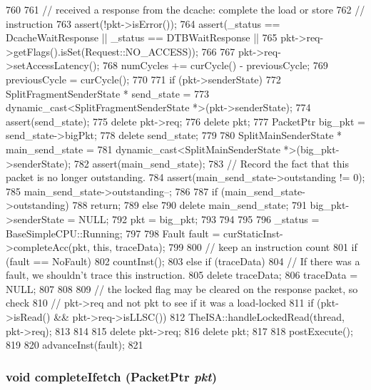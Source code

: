 \begin{DoxyCode}
760 {
761     // received a response from the dcache: complete the load or store
762     // instruction
763     assert(!pkt->isError());
764     assert(_status == DcacheWaitResponse || _status == DTBWaitResponse ||
765            pkt->req->getFlags().isSet(Request::NO_ACCESS));
766 
767     pkt->req->setAccessLatency();
768     numCycles += curCycle() - previousCycle;
769     previousCycle = curCycle();
770 
771     if (pkt->senderState) {
772         SplitFragmentSenderState * send_state =
773             dynamic_cast<SplitFragmentSenderState *>(pkt->senderState);
774         assert(send_state);
775         delete pkt->req;
776         delete pkt;
777         PacketPtr big_pkt = send_state->bigPkt;
778         delete send_state;
779         
780         SplitMainSenderState * main_send_state =
781             dynamic_cast<SplitMainSenderState *>(big_pkt->senderState);
782         assert(main_send_state);
783         // Record the fact that this packet is no longer outstanding.
784         assert(main_send_state->outstanding != 0);
785         main_send_state->outstanding--;
786 
787         if (main_send_state->outstanding) {
788             return;
789         } else {
790             delete main_send_state;
791             big_pkt->senderState = NULL;
792             pkt = big_pkt;
793         }
794     }
795 
796     _status = BaseSimpleCPU::Running;
797 
798     Fault fault = curStaticInst->completeAcc(pkt, this, traceData);
799 
800     // keep an instruction count
801     if (fault == NoFault)
802         countInst();
803     else if (traceData) {
804         // If there was a fault, we shouldn't trace this instruction.
805         delete traceData;
806         traceData = NULL;
807     }
808 
809     // the locked flag may be cleared on the response packet, so check
810     // pkt->req and not pkt to see if it was a load-locked
811     if (pkt->isRead() && pkt->req->isLLSC()) {
812         TheISA::handleLockedRead(thread, pkt->req);
813     }
814 
815     delete pkt->req;
816     delete pkt;
817 
818     postExecute();
819 
820     advanceInst(fault);
821 }
\end{DoxyCode}
\hypertarget{classTimingSimpleCPU_a20b41c38922ef954c7e338f67bba971f}{
\subsubsection[{completeIfetch}]{\setlength{\rightskip}{0pt plus 5cm}void completeIfetch ({\bf PacketPtr} {\em pkt})}}
\label{classTimingSimpleCPU_a20b41c38922ef954c7e338f67bba971f}



